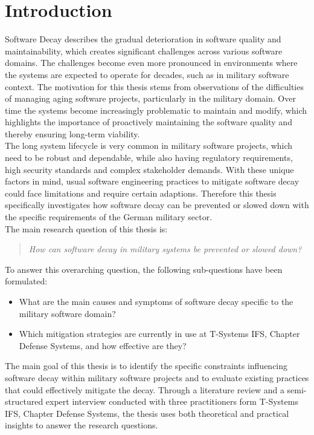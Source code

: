 \section{Introduction}
Software Decay describes the gradual deterioration in software quality and maintainability, which creates significant challenges across various software domains.
The challenges become even more pronounced in environments where the systems are expected to operate for decades, such as in military software context.
The motivation for this thesis stems from observations of the difficulties of managing aging software projects, particularly in the military domain.
Over time the systems become increasingly problematic to maintain and modify, which highlights the importance of proactively maintaining the software quality and thereby ensuring long-term viability.\\
The long system lifecycle is very common in military software projects, which need to be robust and dependable, while also having regulatory requirements,
high security standards and complex stakeholder demands. With these unique factors in mind, usual software engineering practices to mitigate software decay 
could face limitations and require certain adaptions. Therefore this thesis specifically investigates how software decay can be prevented or slowed down
with the specific requirements of the German military sector.\\
The main research question of this thesis is:
\begin{quote}
    \textit{How can software decay in military systems be prevented or slowed down?}
\end{quote}
To answer this overarching question, the following sub-questions have been formulated:
\begin{itemize}
    \item What are the main causes and symptoms of software decay specific to the military software domain?
    \item Which mitigation strategies are currently in use at T-Systems IFS, Chapter Defense Systems, and how effective are they?
\end{itemize}
The main goal of this thesis is to identify the specific constraints influencing software decay within military software projects and to evaluate existing practices that could effectively mitigate the decay.
Through a literature review and a semi-structured expert interview conducted with three practitioners form T-Systems IFS, Chapter Defense Systems, the thesis uses both theoretical and practical insights to answer the research questions.\\

